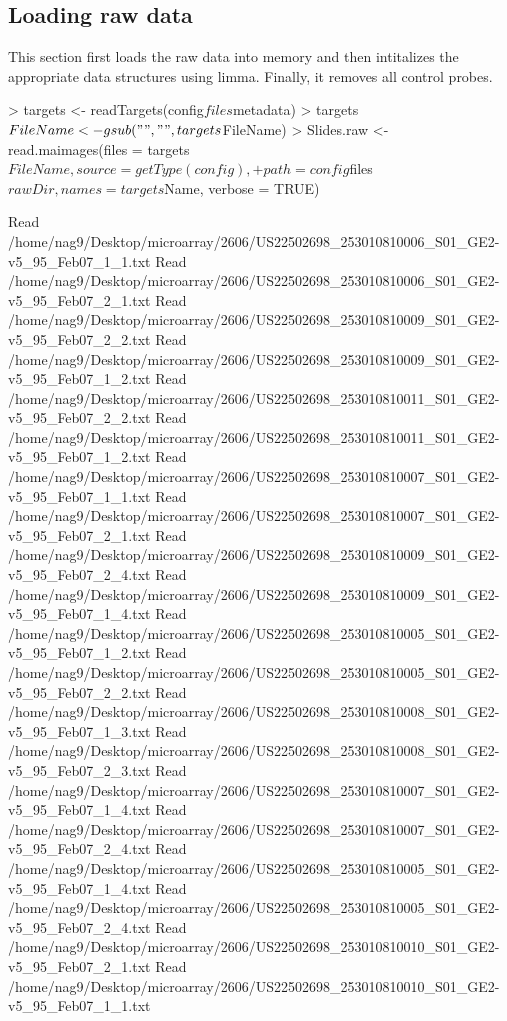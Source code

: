 \documentclass[titlepage]{article}
\begin{document}
\subsection{Loading raw data}
This section first loads the raw data into memory and then
intitalizes the appropriate data structures using limma. Finally, it
removes all control probes. 
\begin{Schunk}
\begin{Sinput}
> targets <- readTargets(config$files$metadata)
> targets$FileName <- gsub(" ", "", targets$FileName)
> Slides.raw <- read.maimages(files = targets$FileName, source = getType(config), 
+     path = config$files$rawDir, names = targets$Name, verbose = TRUE)
\end{Sinput}
\begin{Soutput}
Read /home/nag9/Desktop/microarray/2606/US22502698_253010810006_S01_GE2-v5_95_Feb07_1_1.txt 
Read /home/nag9/Desktop/microarray/2606/US22502698_253010810006_S01_GE2-v5_95_Feb07_2_1.txt 
Read /home/nag9/Desktop/microarray/2606/US22502698_253010810009_S01_GE2-v5_95_Feb07_2_2.txt 
Read /home/nag9/Desktop/microarray/2606/US22502698_253010810009_S01_GE2-v5_95_Feb07_1_2.txt 
Read /home/nag9/Desktop/microarray/2606/US22502698_253010810011_S01_GE2-v5_95_Feb07_2_2.txt 
Read /home/nag9/Desktop/microarray/2606/US22502698_253010810011_S01_GE2-v5_95_Feb07_1_2.txt 
Read /home/nag9/Desktop/microarray/2606/US22502698_253010810007_S01_GE2-v5_95_Feb07_1_1.txt 
Read /home/nag9/Desktop/microarray/2606/US22502698_253010810007_S01_GE2-v5_95_Feb07_2_1.txt 
Read /home/nag9/Desktop/microarray/2606/US22502698_253010810009_S01_GE2-v5_95_Feb07_2_4.txt 
Read /home/nag9/Desktop/microarray/2606/US22502698_253010810009_S01_GE2-v5_95_Feb07_1_4.txt 
Read /home/nag9/Desktop/microarray/2606/US22502698_253010810005_S01_GE2-v5_95_Feb07_1_2.txt 
Read /home/nag9/Desktop/microarray/2606/US22502698_253010810005_S01_GE2-v5_95_Feb07_2_2.txt 
Read /home/nag9/Desktop/microarray/2606/US22502698_253010810008_S01_GE2-v5_95_Feb07_1_3.txt 
Read /home/nag9/Desktop/microarray/2606/US22502698_253010810008_S01_GE2-v5_95_Feb07_2_3.txt 
Read /home/nag9/Desktop/microarray/2606/US22502698_253010810007_S01_GE2-v5_95_Feb07_1_4.txt 
Read /home/nag9/Desktop/microarray/2606/US22502698_253010810007_S01_GE2-v5_95_Feb07_2_4.txt 
Read /home/nag9/Desktop/microarray/2606/US22502698_253010810005_S01_GE2-v5_95_Feb07_1_4.txt 
Read /home/nag9/Desktop/microarray/2606/US22502698_253010810005_S01_GE2-v5_95_Feb07_2_4.txt 
Read /home/nag9/Desktop/microarray/2606/US22502698_253010810010_S01_GE2-v5_95_Feb07_2_1.txt 
Read /home/nag9/Desktop/microarray/2606/US22502698_253010810010_S01_GE2-v5_95_Feb07_1_1.txt 

\end{Soutput}
\end{Schunk}
\end{document}
